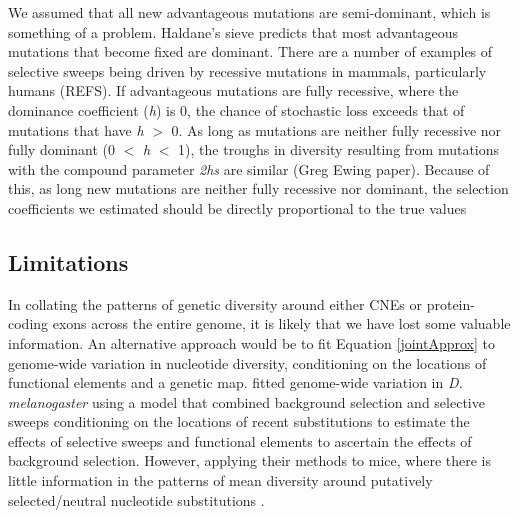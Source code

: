 \documentclass[11pt]{article}
\begin{document}
We assumed that all new advantageous mutations are semi-dominant, which is something of a problem. Haldane's sieve predicts that most advantageous mutations that become fixed are dominant. There are a number of examples of selective sweeps being driven by recessive mutations in mammals, particularly humans (REFS). If advantageous mutations are fully recessive, where the dominance coefficient (\textit{h}) is 0, the chance of stochastic loss exceeds that of mutations that have \textit{h} $>$ 0. As long as mutations are neither fully recessive nor fully dominant (0 $<$ \textit{h} $<$ 1), the troughs in diversity resulting from mutations with the compound parameter \textit{2hs} are similar (Greg Ewing paper). Because of this, as long new mutations are neither fully recessive nor dominant, the selection coefficients we estimated should be directly proportional to the true values




\subsection{Limitations}

	In collating the patterns of genetic diversity around either CNEs or protein-coding exons across the entire genome, it is likely that we have lost some valuable information. An alternative approach would be to fit Equation \ref{jointApprox} to genome-wide variation in nucleotide diversity, conditioning on the locations of functional elements and a genetic map. \cite{RN274} fitted genome-wide variation in \textit{D. melanogaster} using a model that combined background selection and selective sweeps conditioning on the locations of recent substitutions to estimate the effects of selective sweeps and functional elements to ascertain the effects of background selection. However, applying their methods to mice, where there is  little information in the patterns of mean diversity around putatively selected/neutral nucleotide substitutions \cite{RN122}. 
	
\end{document}
